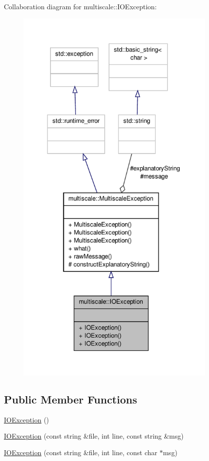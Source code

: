 Collaboration diagram for multiscale\-:\-:I\-O\-Exception\-:\nopagebreak
\begin{figure}[H]
\begin{center}
\leavevmode
\includegraphics[height=550pt]{classmultiscale_1_1IOException__coll__graph}
\end{center}
\end{figure}
\subsection*{Public Member Functions}
\begin{DoxyCompactItemize}
\item 
\hyperlink{classmultiscale_1_1IOException_a08e300bad1251ba4badd004e11507c8c}{I\-O\-Exception} ()
\item 
\hyperlink{classmultiscale_1_1IOException_a081bb2e4c214a18cbace0d93e1b60488}{I\-O\-Exception} (const string \&file, int line, const string \&msg)
\item 
\hyperlink{classmultiscale_1_1IOException_a2ccacf8690ac56b07af15da7fa7bb93a}{I\-O\-Exception} (const string \&file, int line, const char $\ast$msg)
\end{DoxyCompactItemize}
